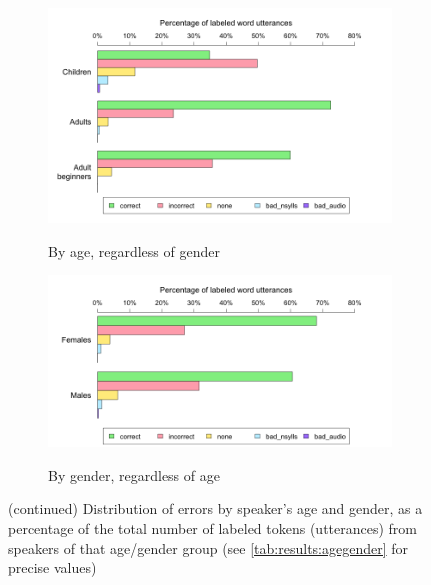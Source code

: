 			\begin{figure}[p]
			\ContinuedFloat
			\centering
			
				\begin{subfigure}{\textwidth}
					\setcounter{subfigure}{1}
					\centering
					\caption{By age, regardless of gender}
					\includegraphics[width=\textwidth]{img/plots/judgmentsAge}
					\label{fig:agegenderbars:age}
				\end{subfigure}
				
				\vspace{1em}
			
				\begin{subfigure}{\textwidth}
					\centering
					\caption{By gender, regardless of age}
					\includegraphics[width=\textwidth]{img/plots/judgmentsGender}
					\label{fig:agegenderbars:gender}
				\end{subfigure}
				
				\vspace{1.5em}
				
				\caption[Error distribution by speaker age and gender (cont.)]{(continued) Distribution of errors by speaker's age and gender,
				as a percentage of the total number of labeled tokens (utterances) from speakers of that age/gender group
				(see \cref{tab:results:agegender} for precise values)
				}
				
			\end{figure}
					
